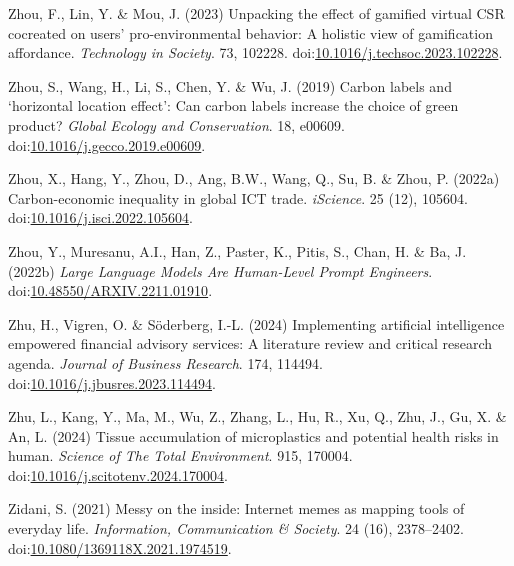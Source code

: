 \documentclass[
  letterpaper,
  DIV=11,
  numbers=noendperiod]{scrartcl}
\newlength{\cslhangindent}
\newenvironment{CSLReferences}[2] %
 {\begin{list}{}{%
  \setlength{\itemindent}{0pt}
  \setlength{\leftmargin}{0pt}
  \setlength{\parsep}{0pt}
  \ifodd #1
   \setlength{\leftmargin}{\cslhangindent}
   \setlength{\itemindent}{-1\cslhangindent}
  \fi
  \setlength{\itemsep}{#2\baselineskip}}}
 {\end{list}}
\begin{document}
\begin{CSLReferences}{0}{1}
Zhou, F., Lin, Y. \& Mou, J. (2023) Unpacking the effect of gamified
virtual {CSR} cocreated on users' pro-environmental behavior: {A}
holistic view of gamification affordance. \emph{Technology in Society}.
73, 102228.
doi:\href{https://doi.org/10.1016/j.techsoc.2023.102228}{10.1016/j.techsoc.2023.102228}.

Zhou, S., Wang, H., Li, S., Chen, Y. \& Wu, J. (2019) Carbon labels and
{`horizontal location effect'}: {Can} carbon labels increase the choice
of green product? \emph{Global Ecology and Conservation}. 18, e00609.
doi:\href{https://doi.org/10.1016/j.gecco.2019.e00609}{10.1016/j.gecco.2019.e00609}.

Zhou, X., Hang, Y., Zhou, D., Ang, B.W., Wang, Q., Su, B. \& Zhou, P.
(2022a) Carbon-economic inequality in global {ICT} trade.
\emph{iScience}. 25 (12), 105604.
doi:\href{https://doi.org/10.1016/j.isci.2022.105604}{10.1016/j.isci.2022.105604}.

Zhou, Y., Muresanu, A.I., Han, Z., Paster, K., Pitis, S., Chan, H. \&
Ba, J. (2022b) \emph{Large {Language Models Are Human-Level Prompt
Engineers}}.
doi:\href{https://doi.org/10.48550/ARXIV.2211.01910}{10.48550/ARXIV.2211.01910}.

Zhu, H., Vigren, O. \& Söderberg, I.-L. (2024) Implementing artificial
intelligence empowered financial advisory services: {A} literature
review and critical research agenda. \emph{Journal of Business
Research}. 174, 114494.
doi:\href{https://doi.org/10.1016/j.jbusres.2023.114494}{10.1016/j.jbusres.2023.114494}.

Zhu, L., Kang, Y., Ma, M., Wu, Z., Zhang, L., Hu, R., Xu, Q., Zhu, J.,
Gu, X. \& An, L. (2024) Tissue accumulation of microplastics and
potential health risks in human. \emph{Science of The Total
Environment}. 915, 170004.
doi:\href{https://doi.org/10.1016/j.scitotenv.2024.170004}{10.1016/j.scitotenv.2024.170004}.

Zidani, S. (2021) Messy on the inside: Internet memes as mapping tools
of everyday life. \emph{Information, Communication \& Society}. 24 (16),
2378--2402.
doi:\href{https://doi.org/10.1080/1369118X.2021.1974519}{10.1080/1369118X.2021.1974519}.


\end{CSLReferences}
\end{document}
